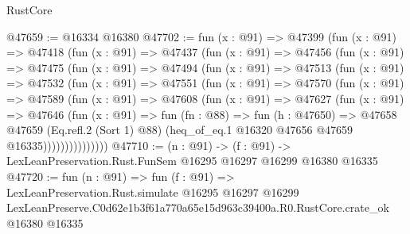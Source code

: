 \begin{lexlean}{RustCore}
\begin{coremodule}
@47659 := @16334 @16380
@47702 := fun (x : @91) =>
  @47399
    (fun (x : @91) =>
    @47418
      (fun (x : @91) =>
      @47437
        (fun (x : @91) =>
        @47456
          (fun (x : @91) =>
          @47475
            (fun (x : @91) =>
            @47494
              (fun (x : @91) =>
              @47513
                (fun (x : @91) =>
                @47532
                  (fun (x : @91) =>
                  @47551
                    (fun (x : @91) =>
                    @47570
                      (fun (x : @91) =>
                      @47589
                        (fun (x : @91) =>
                        @47608
                          (fun (x : @91) =>
                          @47627
                            (fun (x : @91) =>
                            @47646
                              (fun (x : @91) =>
                              fun (fn : @88) =>
                              fun (h : @47650) =>
                              @47658
                                @47659
                                (Eq.refl.{2} (Sort 1) @88)
                                (heq_of_eq.{1} @16320 @47656 @47659 @16335)))))))))))))))
@47710 := (n : @91) ->
  (f : @91) -> LexLeanPreservation.Rust.FunSem @16295 @16297 @16299 @16380 @16335
@47720 := fun (n : @91) =>
  fun (f : @91) =>
  LexLeanPreservation.Rust.simulate
    @16295
    @16297
    @16299
    LexLeanPreserve.C0d62e1b3f61a770a65e15d963c39400a.R0.RustCore.crate_ok
    @16380
    @16335
\end{coremodule}
\end{lexlean}
